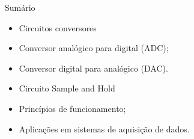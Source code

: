 
\begin{frame}{Sumário}
    \begin{itemize}
        \item Circuitos conversores
        \item Conversor analógico para digital (ADC);
        \item Conversor digital para analógico (DAC).
        \item Circuito Sample and Hold
        \item Princípios de funcionamento;
        \item Aplicações em sistemas de aquisição de dados.
    \end{itemize}
\end{frame}